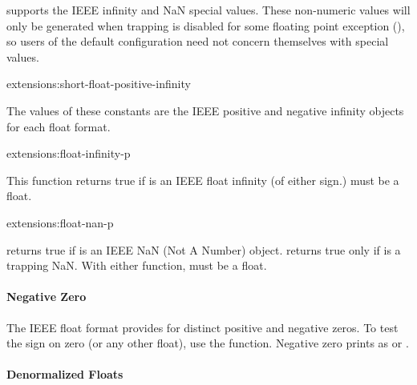 \cmucl{} supports the IEEE infinity and NaN special values.  These
non-numeric values will only be generated when trapping is disabled
for some floating point exception (), so users of
the default configuration need not concern themselves with special
values.

\begin{defconst}{extensions:}{short-float-positive-infinity}
  
  The values of these constants are the IEEE positive and negative
  infinity objects for each float format.
\end{defconst}

\begin{defun}{extensions:}{float-infinity-p}{}
  
  This function returns true if  is an IEEE float infinity (of
  either sign.)   must be a float.
\end{defun}

\begin{defun}{extensions:}{float-nan-p}{}
  
   returns true if  is an IEEE NaN (Not A
  Number) object.   returns true only if
   is a trapping NaN.  With either function,  must be a
  float.
\end{defun}

\paragraph{Negative Zero}

The IEEE float format provides for distinct positive and negative
zeros.  To test the sign on zero (or any other float), use the
\clisp{}  function.  Negative zero prints as
 or .

\paragraph{Denormalized Floats}

